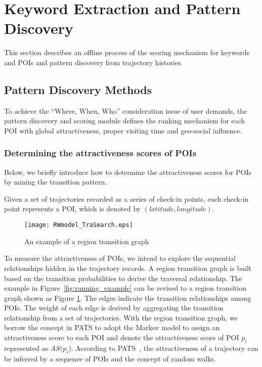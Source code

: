 \section{Keyword Extraction and Pattern Discovery}\label{sec:offline}
This section describes an offline process of the scoring mechanism for keywords and POIs and pattern discovery from trajectory histories.


\subsection{Pattern Discovery Methods}
To achieve the ``Where, When, Who'' consideration issue of user demands, the pattern discovery and scoring module defines the ranking mechanism for each POI with global attractiveness, proper visiting time and geo-social influence.

\subsubsection{Determining the attractiveness scores of POIs}
Below, we briefly introduce how to determine the attractiveness scores for POIs by mining the transition pattern.

Given a set of trajectories recorded as a series of check-in points, each check-in point represents a POI, which is denoted by $(latitude,longitude)$.

\begin{figure}[t]
 \centering
 \texttt{[image: RWmodel\_TraSearch.eps]}
 \caption{An example of a region transition graph}
 \label{fig:RWmodel_TraSearch}
 \end{figure}

To measure the attractiveness of POIs, we intend to explore the sequential relationships hidden in the trajectory records. A region transition graph is built based on the transition probabilities to derive the traversal relationship. The example in Figure~\ref{fig:running_example} can be revised to a region transition graph shown as Figure \ref{fig:RWmodel_TraSearch}. The edges indicate the transition relationships among POIs. The weight of each edge is derived by aggregating the transition relationship from a set of trajectories. With the region transition graph, we borrow the concept in PATS \cite{PATS} to adopt the Markov model to assign an attractiveness score to each POI and denote the attractiveness score of POI $p_{i}$ represented as $AS(p_{i}$). According to PATS~\cite{PATS}, the attractiveness of a trajectory can be inferred by a sequence of POIs and the concept of random walks. %


